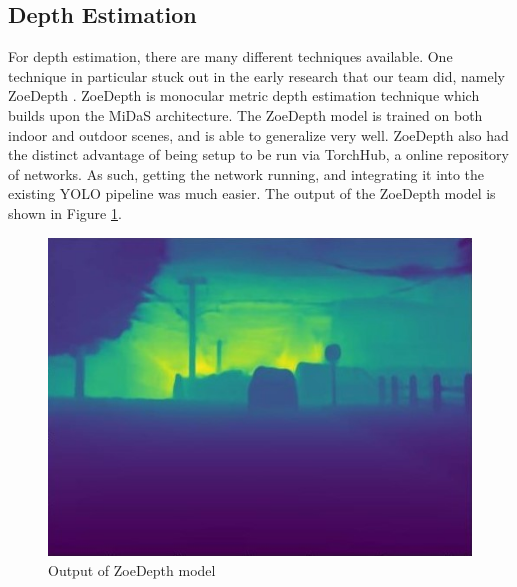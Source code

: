 \subsection{Depth Estimation}
For depth estimation, there are many different techniques available. One technique in particular stuck out in the early research that our team did, namely ZoeDepth \cite{ZoeDepth}. ZoeDepth is monocular metric depth estimation technique which builds upon the MiDaS architecture. The ZoeDepth model is trained on both indoor and outdoor scenes, and is able to generalize very well. ZoeDepth also had the distinct advantage of being setup to be run via TorchHub, a online repository of networks. As such, getting the network running, and integrating it into the existing YOLO pipeline was much easier. The output of the ZoeDepth model is shown in Figure \ref{fig:zoe_depth_output}.

\begin{figure}
    \centering
    \includegraphics[width=0.95\linewidth]{images/depth.jpg}
    \caption{Output of ZoeDepth model}
    \label{fig:zoe_depth_output}
\end{figure}


